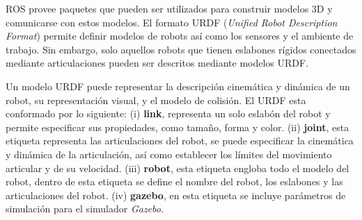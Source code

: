 ROS provee paquetes que pueden ser utilizados para construir modelos 3D y comunicarse 
con estos modelos. El formato URDF (\textit{Unified Robot Description Format}) permite 
definir modelos de robots así como los sensores y el ambiente de trabajo. Sin embargo, solo 
aquellos robots que tienen eslabones rígidos conectados mediante articulaciones pueden ser 
descritos mediante modelos URDF.

Un modelo URDF puede representar la descripción cinemática y dinámica de un robot, su 
representación visual, y el modelo de colisión. El URDF esta conformado por lo siguiente: 
(i) \textbf{link}, representa un solo eslabón del robot y permite especificar sus propiedades, 
como tamaño, forma y color. (ii) \textbf{joint}, esta etiqueta representa las articulaciones del 
robot, se puede especificar la cinemática y dinámica de la articulación, así como establecer 
los límites del movimiento articular y de su velocidad. (iii) \textbf{robot}, esta etiqueta 
engloba todo el modelo del robot, dentro de esta etiqueta se define el nombre del robot, los 
eslabones y las articulaciones del robot. (iv) \textbf{gazebo}, en esta etiqueta se incluye 
parámetros de simulación para el simulador \textit{Gazebo}.




